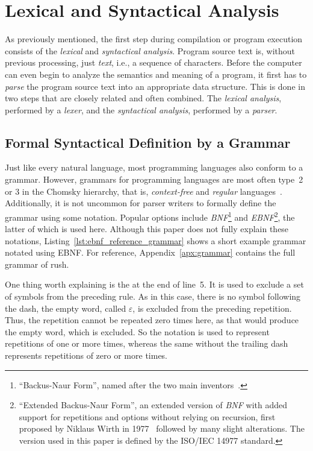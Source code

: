 \section{Lexical and Syntactical Analysis}

As previously mentioned, the first step during compilation or program execution consists of the \emph{lexical} and \emph{syntactical analysis}.
Program source text is, without previous processing, just \emph{text}, i.e., a sequence of characters.
Before the computer can even begin to analyze the semantics and meaning of a program, it first has to \emph{parse} the program source text into an appropriate data structure.
This is done in two steps that are closely related and often combined.
The \emph{lexical analysis}, performed by a \emph{lexer}, and the \emph{syntactical analysis}, performed by a \emph{parser}.

\subsection{Formal Syntactical Definition by a Grammar}

Just like every natural language, most programming languages also conform to a grammar.
However, grammars for programming languages are most often type~2 or 3 in the Chomsky hierarchy, that is, \emph{context-free} and \emph{regular} languages~\cite[pp.~23f]{Watson2017}.
Additionally, it is not uncommon for parser writers to formally define the grammar using some notation.
Popular options include \emph{BNF}\footnote{\enquote{Backus-Naur Form}, named after the two main inventors~\cite{Backus1960}.} and \emph{EBNF}\footnote{\enquote{Extended Backus-Naur Form}, an extended version of \emph{BNF} with added support for repetitions and options without relying on recursion, first proposed by Niklaus Wirth in 1977~\cite{Wirth1977} followed by many slight alterations. The version used in this paper is defined by the ISO/IEC 14977 standard.}, the latter of which is used here.
Although this paper does not fully explain these notations, Listing~\ref{lst:ebnf_reference_grammar} shows a short example grammar notated using EBNF\@.
For reference, Appendix~\ref{apx:grammar} contains the full grammar of rush.


One thing worth explaining is the \qVerb{-} at the end of line~5.
It is used to exclude a set of symbols from the preceding rule.
As in this case, there is no symbol following the dash, the empty word, called $\varepsilon$, is excluded from the preceding repetition.
Thus, the repetition cannot be repeated zero times here, as that would produce the empty word, which is excluded.
So the notation  is used to represent repetitions of one or more times, whereas the same without the trailing dash represents repetitions of zero or more times.

